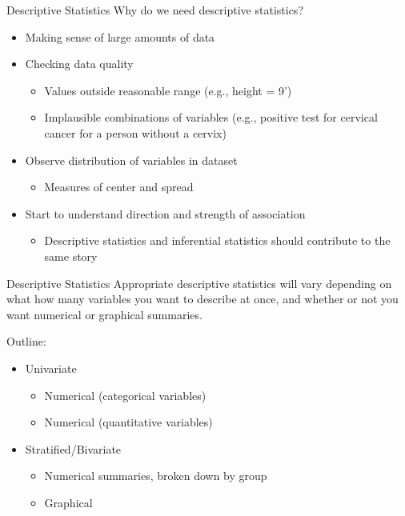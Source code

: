 \documentclass[10pt,t]{beamer}
\begin{document}
\begin{frame}{Descriptive Statistics}
Why do we need descriptive statistics?

\vspace{0.3cm}

\begin{itemize}
	\item Making sense of large amounts of data
	\item Checking data quality
	\begin{itemize}
		\item Values outside reasonable range (e.g., height = 9')
		\item Implausible combinations of variables (e.g., positive test for cervical cancer for a person without a cervix)
	\end{itemize}
	\item Observe distribution of variables in dataset
	\begin{itemize}
		\item Measures of center and spread
	\end{itemize}
	\item Start to understand direction and strength of association
	\begin{itemize}
		\item Descriptive statistics and inferential statistics should contribute to the same story
	\end{itemize}
\end{itemize}

\end{frame}

\begin{frame}{Descriptive Statistics}
Appropriate descriptive statistics will vary depending on what how many variables you want to describe at once, and whether or not you want numerical or graphical summaries.

\vspace{0.3cm}

Outline:
\begin{itemize}
	\item Univariate
	\begin{itemize}
		\item Numerical (categorical variables)
		\item Numerical (quantitative variables)
	\end{itemize}
	\item Stratified/Bivariate
	\begin{itemize}
		\item Numerical summaries, broken down by group
		\item Graphical
	\end{itemize}
\end{itemize}
\end{frame}
\end{document}
